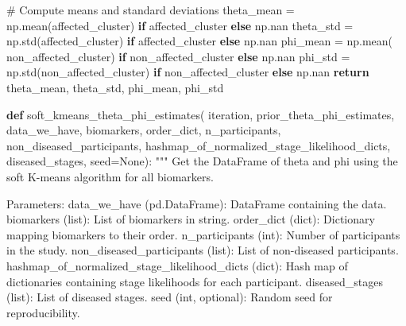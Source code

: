 \documentclass[
  letterpaper,
  DIV=11,
  numbers=noendperiod]{scrreprt}
\newenvironment{Shaded}{\begin{snugshade}}{\end{snugshade}}
\newcommand{\CommentTok}[1]{\textcolor[rgb]{0.37,0.37,0.37}{#1}}
\newcommand{\ControlFlowTok}[1]{\textcolor[rgb]{0.00,0.23,0.31}{\textbf{#1}}}
\newcommand{\KeywordTok}[1]{\textcolor[rgb]{0.00,0.23,0.31}{\textbf{#1}}}
\newcommand{\NormalTok}[1]{\textcolor[rgb]{0.00,0.23,0.31}{#1}}
\newcommand{\OperatorTok}[1]{\textcolor[rgb]{0.37,0.37,0.37}{#1}}
\newcommand{\VariableTok}[1]{\textcolor[rgb]{0.07,0.07,0.07}{#1}}
\begin{document}
\begin{Shaded}
\begin{Highlighting}[]
    \CommentTok{\# Compute means and standard deviations}
\NormalTok{    theta\_mean }\OperatorTok{=}\NormalTok{ np.mean(affected\_cluster) }\ControlFlowTok{if}\NormalTok{ affected\_cluster }\ControlFlowTok{else}\NormalTok{ np.nan}
\NormalTok{    theta\_std }\OperatorTok{=}\NormalTok{ np.std(affected\_cluster) }\ControlFlowTok{if}\NormalTok{ affected\_cluster }\ControlFlowTok{else}\NormalTok{ np.nan}
\NormalTok{    phi\_mean }\OperatorTok{=}\NormalTok{ np.mean(}
\NormalTok{        non\_affected\_cluster) }\ControlFlowTok{if}\NormalTok{ non\_affected\_cluster }\ControlFlowTok{else}\NormalTok{ np.nan}
\NormalTok{    phi\_std }\OperatorTok{=}\NormalTok{ np.std(non\_affected\_cluster) }\ControlFlowTok{if}\NormalTok{ non\_affected\_cluster }\ControlFlowTok{else}\NormalTok{ np.nan}
    \ControlFlowTok{return}\NormalTok{ theta\_mean, theta\_std, phi\_mean, phi\_std}

\KeywordTok{def}\NormalTok{ soft\_kmeans\_theta\_phi\_estimates(}
\NormalTok{        iteration,}
\NormalTok{        prior\_theta\_phi\_estimates,}
\NormalTok{        data\_we\_have,}
\NormalTok{        biomarkers,}
\NormalTok{        order\_dict,}
\NormalTok{        n\_participants,}
\NormalTok{        non\_diseased\_participants,}
\NormalTok{        hashmap\_of\_normalized\_stage\_likelihood\_dicts,}
\NormalTok{        diseased\_stages,}
\NormalTok{        seed}\OperatorTok{=}\VariableTok{None}\NormalTok{):}
    \CommentTok{"""}
\CommentTok{    Get the DataFrame of theta and phi using the soft K{-}means algorithm for all biomarkers.}

\CommentTok{    Parameters:}
\CommentTok{        data\_we\_have (pd.DataFrame): DataFrame containing the data.}
\CommentTok{        biomarkers (list): List of biomarkers in string.}
\CommentTok{        order\_dict (dict): Dictionary mapping biomarkers to their order.}
\CommentTok{        n\_participants (int): Number of participants in the study.}
\CommentTok{        non\_diseased\_participants (list): List of non{-}diseased participants.}
\CommentTok{        hashmap\_of\_normalized\_stage\_likelihood\_dicts (dict): Hash map of dictionaries containing stage likelihoods for each participant.}
\CommentTok{        diseased\_stages (list): List of diseased stages.}
\CommentTok{        seed (int, optional): Random seed for reproducibility.}


\end{Highlighting}
\end{Shaded}
\end{document}
